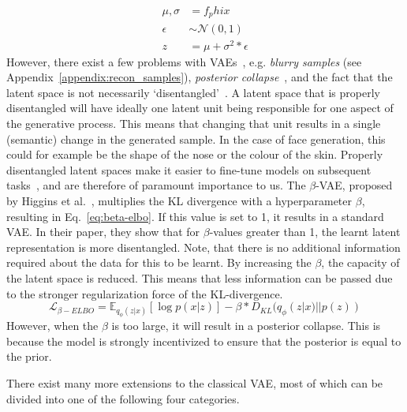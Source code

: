 \begin{equation}
    \begin{split}
        \mu, \sigma & = f_phi{x}                  \\
        \epsilon    & \sim \mathcal{N}(0, 1)      \\
        z           & = \mu + \sigma^2 * \epsilon
    \end{split}
    \label{eq:reparameterization-trick}
\end{equation}
However, there exist a few problems with VAEs~\cite{tomczak2021deep}, e.g. \emph{blurry samples} (see Appendix~\ref{appendix:recon_samples}), \emph{posterior collapse}~\cite{DBLP:journals/corr/BowmanVVDJB15}, and the fact that the latent space is not necessarily `disentangled'~\cite{higgins2017betavae}. A latent space that is properly disentangled will have ideally one latent unit being responsible for one aspect of the generative process. This means that changing that unit results in a single (semantic) change in the generated sample. In the case of face generation, this could for example be the shape of the nose or the colour of the skin. Properly disentangled latent spaces make it easier to fine-tune models on subsequent tasks~\cite{bengio2014representationlearningreviewnew}, and are therefore of paramount importance to us. The $\beta$-VAE, proposed by Higgins et al.~\cite{higgins2017betavae}, multiplies the KL divergence with a hyperparameter $\beta$, resulting in Eq.~\ref{eq:beta-elbo}. If this value is set to 1, it results in a standard VAE. In their paper, they show that for $\beta$-values greater than 1, the learnt latent representation is more disentangled. Note, that there is no additional information required about the data for this to be learnt. By increasing the $\beta$, the capacity of the latent space is reduced. This means that less information can be passed due to the stronger regularization force of the KL-divergence.
\begin{equation}
    \mathcal{L}_{\beta-ELBO} = \mathbb{E}_{q_{\phi}(z|x)}[\log p(x|z)] - \beta * D_{KL}(q_{\phi}(z|x) || p(z))
    \label{eq:beta-elbo}
\end{equation}
However, when the $\beta$ is too large, it will result in a posterior collapse. This is because the model is strongly incentivized to ensure that the posterior is equal to the prior.

There exist many more extensions to the classical VAE, most of which can be divided into one of the following four categories.

